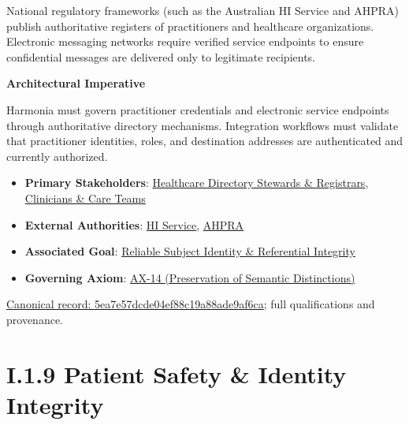 National regulatory frameworks (such as the Australian HI Service and AHPRA) publish authoritative registers of practitioners and healthcare organizations. Electronic messaging networks require verified service endpoints to ensure confidential messages are delivered only to legitimate recipients.



\par\medskip\textbf{Architectural Imperative}\par


Harmonia must govern practitioner credentials and electronic service endpoints through authoritative directory mechanisms. Integration workflows must validate that practitioner identities, roles, and destination addresses are authenticated and currently authorized.



\begin{itemize}


\item \textbf{Primary Stakeholders}: \href{\detokenize{../../../../../docs/markdown/01-motivation/stakeholders/enterprise-stakeholders.md}}{Healthcare Directory Stewards \& Registrars}, \href{\detokenize{../../../../../docs/markdown/01-motivation/stakeholders/enterprise-stakeholders.md}}{Clinicians \& Care Teams}

\item \textbf{External Authorities}: \href{\detokenize{../../../../../docs/markdown/01-motivation/stakeholders/external-authorities.md}}{HI Service}, \href{\detokenize{../../../../../docs/markdown/01-motivation/stakeholders/external-authorities.md}}{AHPRA}

\item \textbf{Associated Goal}: \href{\detokenize{../../../../../docs/markdown/01-motivation/goals-outcomes/strategic-goals.md}}{Reliable Subject Identity \& Referential Integrity}

\item \textbf{Governing Axiom}: \hyperref[element:d3fc6025dc7646d1b2020b51f7a44bfa]{AX-14 (Preservation of Semantic Distinctions)}

\end{itemize}

{\footnotesize \href{../../../../continuum/motivation/driver/5ea7e57dcde04ef88c19a88ade9af6ca.md}{Canonical record: 5ea7e57dcde04ef88c19a88ade9af6ca}; full qualifications and provenance.}\par
\section*{I.1.9 Patient Safety \& Identity Integrity}
\label{navigation:I.1.9}


